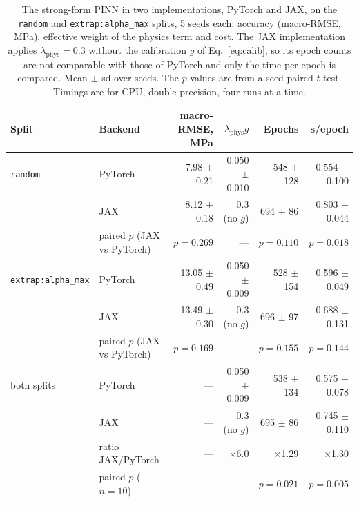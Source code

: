 \documentclass[subscriptcorrection,upint,varvw,barcolor=Goldenrod3,mathalfa=cal=euler,balance,hyphenate,french,pdf-a]{asmejour} %
\begin{document}
\begin{table}[t]
\centering
\caption[The strong-form PINN in PyTorch and in JAX]{The strong-form PINN in two implementations, PyTorch and JAX, on the \texttt{random} and \texttt{extrap:alpha\_max} splits, 5 seeds each: accuracy (macro-RMSE, MPa), effective weight of the physics term and cost. The JAX implementation applies $\lambda_{\mathrm{phys}}=0.3$ without the calibration $g$ of Eq.~\eqref{eq:calib}, so its epoch counts are not comparable with those of PyTorch and only the time per epoch is compared. Mean $\pm$ sd over seeds. The $p$-values are from a seed-paired $t$-test. Timings are for CPU, double precision, four runs at a time.}
\label{tab:backend}
\small
\begin{tabular}{@{}llrrrr@{}}
\toprule
Split & Backend & macro-RMSE, MPa & $\lambda_{\mathrm{phys}}g$ & Epochs & s/epoch \\
\midrule
\texttt{random} & PyTorch & 7.98 $\pm$ 0.21 & 0.050 $\pm$ 0.010 & 548 $\pm$ 128 & 0.554 $\pm$ 0.100 \\
 & JAX & 8.12 $\pm$ 0.18 & 0.3 (no $g$) & 694 $\pm$ 86 & 0.803 $\pm$ 0.044 \\
 & paired $p$ (JAX vs PyTorch) & $p = 0.269$ & --- & $p = 0.110$ & $p = 0.018$ \\
\addlinespace
\texttt{extrap:alpha\_max} & PyTorch & 13.05 $\pm$ 0.49 & 0.050 $\pm$ 0.009 & 528 $\pm$ 154 & 0.596 $\pm$ 0.049 \\
 & JAX & 13.49 $\pm$ 0.30 & 0.3 (no $g$) & 696 $\pm$ 97 & 0.688 $\pm$ 0.131 \\
 & paired $p$ (JAX vs PyTorch) & $p = 0.169$ & --- & $p = 0.155$ & $p = 0.144$ \\
\midrule
both splits & PyTorch & --- & 0.050 $\pm$ 0.009 & 538 $\pm$ 134 & 0.575 $\pm$ 0.078 \\
 & JAX & --- & 0.3 (no $g$) & 695 $\pm$ 86 & 0.745 $\pm$ 0.110 \\
 & ratio JAX/PyTorch & --- & $\times$6.0 & $\times$1.29 & $\times$1.30 \\
 & paired $p$ ($n = 10$) & --- & --- & $p = 0.021$ & $p = 0.005$ \\
\bottomrule
\end{tabular}
\end{table}
\end{document}
